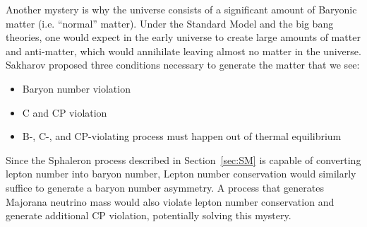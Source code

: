 \documentclass[/main.tex]{subfiles}
\begin{document}
Another mystery is why the universe consists of a significant amount of Baryonic matter (i.e. ``normal'' matter).
Under the Standard Model and the big bang theories, one would expect in the early universe to create large amounts of matter and anti-matter, which would annihilate leaving almost no matter in the universe.
Sakharov proposed three conditions necessary to generate the matter that we see\cite{Sakharov1967}:
\begin{itemize}
\item Baryon number violation
\item C and CP violation
\item B-, C-, and CP-violating process must happen out of thermal equilibrium
\end{itemize}
Since the Sphaleron process described in Section~\ref{sec:SM} is capable of converting lepton number into baryon number, Lepton number conservation would similarly suffice to generate a baryon number asymmetry.
A process that generates Majorana neutrino mass would also violate lepton number conservation and generate additional CP violation, potentially solving this mystery.
\end{document}
